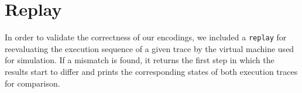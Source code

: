 \section{Replay}

In order to validate the correctness of our encodings, we included a \texttt{replay}  for reevaluating the execution sequence of a given trace by the virtual machine used for simulation.
If a mismatch is found, it returns the first step in which the results start to differ and prints the corresponding states of both execution traces for comparison.
